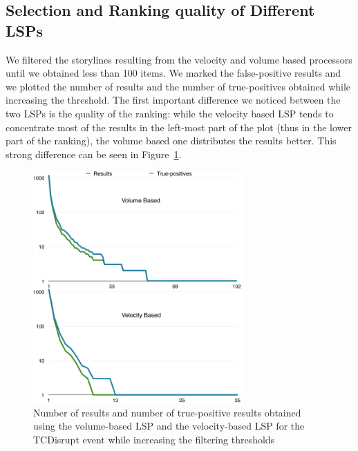 \documentclass{sig-alternate}
\begin{document}
\subsection{Selection and Ranking quality of Different LSPs}
\label{sec:selection_and_ranking_quality}
We filtered the storylines resulting from the velocity and volume based processors until we obtained less than 100 items. We marked the false-positive results and we plotted the number of results and the number of true-positives obtained while increasing the threshold. The first important difference we noticed between the two LSPs is the quality of the ranking: while the velocity based LSP tends to concentrate most of the results in the left-most part of the plot (thus in the lower part of the ranking), the volume based one distributes the results better. This strong difference can be seen in Figure~\ref{fig:tcdisrupt_plots}.
\begin{figure}[htbp]
  \centering
  \includegraphics[width=8cm]{Figures/tcdisrupt_plots.png}
  \caption{Number of results and number of true-positive results obtained using the volume-based LSP and the velocity-based LSP for the TCDisrupt event while increasing the filtering thresholds}
  \label{fig:tcdisrupt_plots}
\end{figure}
\end{document}
